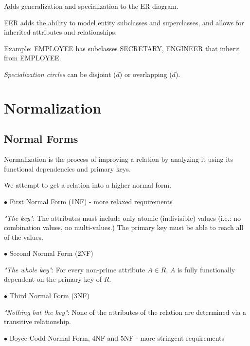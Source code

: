 \documentclass[english,openany]{book}
\begin{document}
    Adds generalization and specialization to the ER diagram.

    EER adds the ability to model entity subclasses and superclasses, and allows for inherited attributes and relationships.

    Example: EMPLOYEE has subclasses SECRETARY, ENGINEER that inherit from EMPLOYEE.

    \textit{Specialization circles} can be disjoint ($d$) or overlapping ($d$).

    \chapter{Normalization}

    \section{Normal Forms}

    Normalization is the process of improving a relation by analyzing it using its functional dependencies and primary keys.

    We attempt to get a relation into a higher normal form.

    $\bullet$ First Normal Form (1NF) - more relaxed requirements

    \textit{"The key"}: The attributes must include only atomic (indivisible) values (i.e.: no combination values, no multi-values.) The primary key must be able to reach all of the values.

    $\bullet$ Second Normal Form (2NF)

    \textit{"The whole key"}: For every non-prime attribute $A \in R$, $A$ is fully functionally dependent on the primary key of $R$.

    $\bullet$ Third Normal Form (3NF)

    \textit{"Nothing but the key"}: None of the attributes of the relation are determined via a transitive relationship.

    $\bullet$ Boyce-Codd Normal Form, 4NF and 5NF - more stringent requirements
\end{document}
